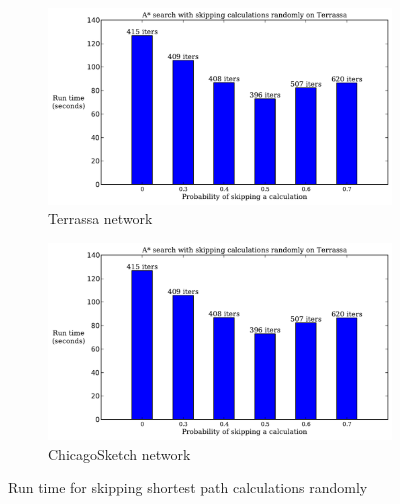 \begin{figure}
    \centering
    \begin{subfigure}{.5\textwidth}
        \centering
        \includegraphics[page=1,width=\textwidth]{img/random_time}
        \caption{Terrassa network}
        \label{fig:terrassa_skip_n}
    \end{subfigure}%
    \begin{subfigure}{.5\textwidth}
        \centering
        \includegraphics[page=2,width=\textwidth]{img/random_time}
        \caption{ChicagoSketch network}
        \label{fig:chicago_skip_n}
    \end{subfigure}
    \caption{Run time for skipping shortest path calculations randomly}
    \label{fig:skip_n}
\end{figure}


